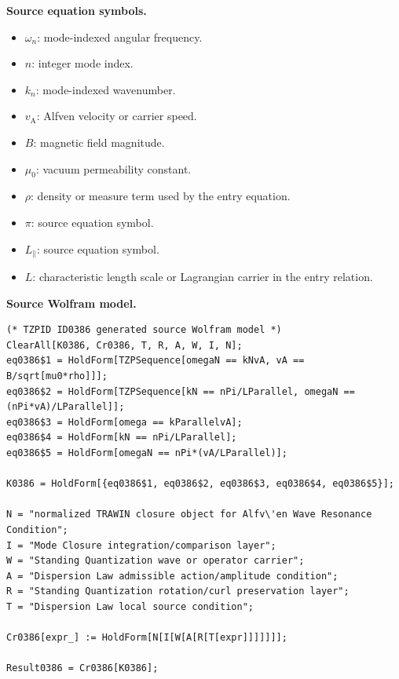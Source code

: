 \begin{minipage}[t]{0.49\linewidth}
\begingroup
\small
\raggedright
\textbf{Source equation symbols.}\par
\begin{itemize}[leftmargin=1.35em,itemsep=1pt,topsep=1pt,parsep=0pt]
    \item $\omega_{n}$: mode-indexed angular frequency.
    \item $n$: integer mode index.
    \item $k_{n}$: mode-indexed wavenumber.
    \item $v_{\mathrm{A}}$: Alfven velocity or carrier speed.
    \item $B$: magnetic field magnitude.
    \item $\mu_{0}$: vacuum permeability constant.
    \item $\rho$: density or measure term used by the entry equation.
    \item $\pi$: source equation symbol.
    \item $L_{\parallel}$: source equation symbol.
    \item $L$: characteristic length scale or Lagrangian carrier in the entry relation.
\end{itemize}
\endgroup
\end{minipage}\hfill
\begin{minipage}[t]{0.47\linewidth}
\begingroup
\scriptsize
\raggedright
\textbf{Source Wolfram model.}\par
\begin{Verbatim}[fontsize=\tiny,breaklines=true,breakanywhere=true]
(* TZPID ID0386 generated source Wolfram model *)
ClearAll[K0386, Cr0386, T, R, A, W, I, N];
eq0386$1 = HoldForm[TZPSequence[omegaN == kNvA, vA == B/sqrt[mu0*rho]]];
eq0386$2 = HoldForm[TZPSequence[kN == nPi/LParallel, omegaN == (nPi*vA)/LParallel]];
eq0386$3 = HoldForm[omega == kParallelvA];
eq0386$4 = HoldForm[kN == nPi/LParallel];
eq0386$5 = HoldForm[omegaN == nPi*(vA/LParallel)];

K0386 = HoldForm[{eq0386$1, eq0386$2, eq0386$3, eq0386$4, eq0386$5}];

N = "normalized TRAWIN closure object for Alfv\'en Wave Resonance Condition";
I = "Mode Closure integration/comparison layer";
W = "Standing Quantization wave or operator carrier";
A = "Dispersion Law admissible action/amplitude condition";
R = "Standing Quantization rotation/curl preservation layer";
T = "Dispersion Law local source condition";

Cr0386[expr_] := HoldForm[N[I[W[A[R[T[expr]]]]]]];

Result0386 = Cr0386[K0386];
\end{Verbatim}
\endgroup
\end{minipage}

